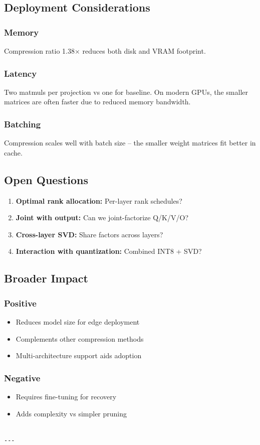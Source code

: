 \subsection{Deployment Considerations}

\subsubsection{Memory}

Compression ratio 1.38$\times$ reduces both disk and VRAM footprint.

\subsubsection{Latency}

Two matmuls per projection vs one for baseline. On modern GPUs, the smaller 
matrices are often faster due to reduced memory bandwidth.

\subsubsection{Batching}

Compression scales well with batch size -- the smaller weight matrices fit 
better in cache.

\subsection{Open Questions}

\begin{enumerate}
\item \textbf{Optimal rank allocation:} Per-layer rank schedules?
\item \textbf{Joint with output:} Can we joint-factorize Q/K/V/O?
\item \textbf{Cross-layer SVD:} Share factors across layers?
\item \textbf{Interaction with quantization:} Combined INT8 + SVD?

\end{enumerate}
\subsection{Broader Impact}

\subsubsection{Positive}
\begin{itemize}
\item Reduces model size for edge deployment
\item Complements other compression methods
\item Multi-architecture support aids adoption

\end{itemize}
\subsubsection{Negative}
\begin{itemize}
\item Requires fine-tuning for recovery
\item Adds complexity vs simpler pruning
\end{itemize}
\begin{lstlisting}

---
\end{lstlisting}